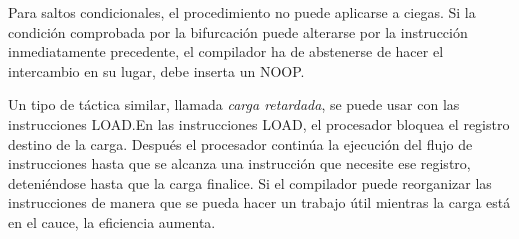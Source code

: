 Para saltos condicionales, el procedimiento no puede aplicarse a ciegas. Si la condición comprobada por la bifurcación puede alterarse por la instrucción inmediatamente precedente, el compilador ha de abstenerse de hacer el intercambio en su lugar, debe inserta un NOOP.\@

Un tipo de táctica similar, llamada \textit{carga retardada}, se puede usar con las instrucciones LOAD.\@ En las instrucciones LOAD, el procesador bloquea el registro destino de la carga. Después el procesador continúa la ejecución del flujo de instrucciones hasta que se alcanza una instrucción que necesite ese registro, deteniéndose hasta que la carga finalice. Si el compilador puede reorganizar las instrucciones de manera que se pueda hacer un trabajo útil mientras la carga está en el cauce, la eficiencia aumenta.\@

